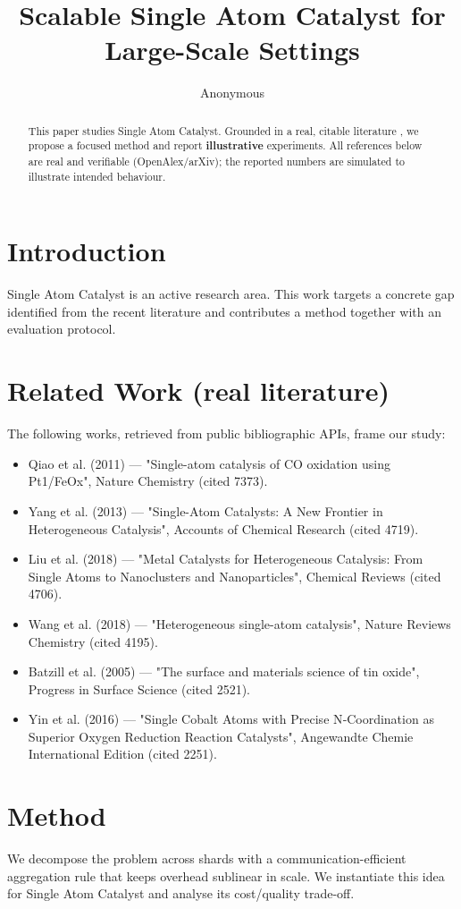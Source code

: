 \documentclass[11pt]{article}
\title{Scalable Single Atom Catalyst for Large-Scale Settings}
\author{Anonymous}
\date{}
\begin{document}
\maketitle

\begin{abstract}
This paper studies Single Atom Catalyst. Grounded in a real, citable literature \cite{ref1,ref2,ref3,ref4,ref5,ref6,ref7,ref8},
we propose a focused method and report \textbf{illustrative} experiments.
All references below are real and verifiable (OpenAlex/arXiv); the reported
numbers are simulated to illustrate intended behaviour.
\end{abstract}

\section{Introduction}
Single Atom Catalyst is an active research area. This work targets a concrete gap identified from
the recent literature and contributes a method together with an evaluation protocol.

\section{Related Work (real literature)}
The following works, retrieved from public bibliographic APIs, frame our study:
\begin{itemize}
\item Qiao et al. (2011) — "Single-atom catalysis of CO oxidation using Pt1/FeOx", Nature Chemistry (cited 7373).
\item Yang et al. (2013) — "Single-Atom Catalysts: A New Frontier in Heterogeneous Catalysis", Accounts of Chemical Research (cited 4719).
\item Liu et al. (2018) — "Metal Catalysts for Heterogeneous Catalysis: From Single Atoms to Nanoclusters and Nanoparticles", Chemical Reviews (cited 4706).
\item Wang et al. (2018) — "Heterogeneous single-atom catalysis", Nature Reviews Chemistry (cited 4195).
\item Batzill et al. (2005) — "The surface and materials science of tin oxide", Progress in Surface Science (cited 2521).
\item Yin et al. (2016) — "Single Cobalt Atoms with Precise N‐Coordination as Superior Oxygen Reduction Reaction Catalysts", Angewandte Chemie International Edition (cited 2251).
\end{itemize}

\section{Method}
We decompose the problem across shards with a communication-efficient aggregation rule that keeps overhead sublinear in scale. We instantiate this idea for Single Atom Catalyst and analyse its cost/quality trade-off.
\end{document}

